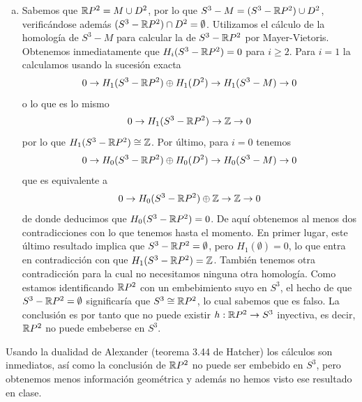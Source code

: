 \documentclass[twoside]{article}
\begin{document}
\begin{solucion}
\begin{enumerate}[(a)]
%
\newpage

\item Sabemos que $\mathbb{R} P^2 = M\cup D^2$, por lo que $S^3-M=(S^3-\mathbb{R} P^2)\cup D^2$, verificándose además $(S^3-\mathbb{R} P^2)\cap D^2=\emptyset$. Utilizamos el cálculo de la homología de $S^3-M$ para calcular la de $S^3-\mathbb{R} P^2$ por Mayer-Vietoris. Obtenemos inmediatamente que $H_i(S^3-\mathbb{R} P^2)=0$ para $i\geq 2$. Para $i=1$ la calculamos usando la sucesión exacta
\[
0\to H_1(S^3-\mathbb{R} P^2)\oplus H_1(D^2)\to H_1(S^3-M)\to 0
\]
o lo que es lo mismo
\[
0\to H_1(S^3-\mathbb{R} P^2)\to \mathbb{Z}\to 0
\]
por lo que $H_1(S^3-\mathbb{R} P^2)\cong \mathbb{Z}$. Por último, para $i=0$ tenemos
\[
0\to H_0(S^3-\mathbb{R} P^2)\oplus H_0(D^2)\to H_0(S^3-M)\to 0
\]
que es equivalente a 
\[
0\to H_0(S^3-\mathbb{R} P^2)\oplus \mathbb{Z}\to \mathbb{Z}\to 0
\]
de donde deducimos que $H_0(S^3-\mathbb{R} P^2)=0$. De aquí obtenemos al menos dos contradicciones con lo que tenemos hasta el momento. En primer lugar, este último resultado implica que $S^3-\mathbb{R} P^2=\emptyset$, pero $H_1(\emptyset)=0$, lo que entra en contradicción con que $H_1(S^3-\mathbb{R} P^2)=\mathbb{Z}$. También tenemos otra contradicción para la cual no necesitamos ninguna otra homología. Como estamos identificando $\mathbb{R} P^2$ con un embebimiento suyo en $S^3$, el hecho de que $S^3-\mathbb{R} P^2=\emptyset$ significaría que $S^3\cong \mathbb{R} P^2$, lo cual sabemos que es falso. La conclusión es por tanto que no puede existir $h:\mathbb{R} P^2\to S^3$ inyectiva, es decir, $\mathbb{R} P^2$ no puede embeberse en $S^3$. 
%
\end{enumerate}

\begin{nota}
Usando la dualidad de Alexander (teorema 3.44 de Hatcher) los cálculos son inmediatos, así como la conclusión de $\mathbb{R} P^2$ no puede ser embebido en $S^3$, pero obtenemos menos información geométrica y además no hemos visto ese resultado en clase.
\end{nota}

\end{solucion}
\end{document}
